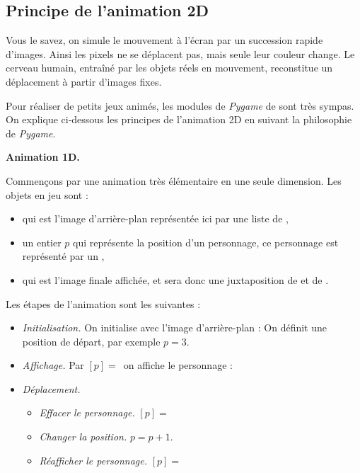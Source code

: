 \documentclass[11pt,class=report,crop=false]{standalone}
\begin{document}
\subsection{Principe de l'animation 2D}

Vous le savez, on simule le mouvement à l'écran par un succession rapide d'images.
Ainsi les pixels ne se déplacent pas, mais seule leur couleur change.
Le cerveau humain, entraîné par les objets réels en mouvement, reconstitue un déplacement à partir d'images fixes.


Pour réaliser de petits jeux animés, les modules de \emph{Pygame} de \Python{} sont très sympas.
On explique ci-dessous les principes de l'animation 2D en suivant la philosophie de \emph{Pygame}.


\textbf{Animation 1D.}

Commençons par une animation très élémentaire en une seule dimension.
Les objets en jeu sont :
\begin{itemize}
	\item {} qui est l'image d'arrière-plan représentée ici par une liste de ,
	\item un entier $p$ qui représente la position d'un personnage, ce personnage est représenté par un ,
	\item {} qui est l'image finale affichée, et sera donc une juxtaposition de  et de .
\end{itemize}

Les étapes de l'animation sont les suivantes :
\begin{itemize}
	\item \emph{Initialisation.}
	On initialise  avec l'image d'arrière-plan  :
	On définit une position de départ, par exemple $p=3$.
	
	\item \emph{Affichage.} Par $[p] = $\, on affiche le personnage :
	
	\item \emph{Déplacement.}
	\begin{itemize}
		\item \emph{Effacer le personnage.} $[p] = $\,
		\item \emph{Changer la position.} $p = p+1$.
		\item \emph{Réafficher le personnage.} $[p] = $\,		
	\end{itemize}

\end{itemize}
\end{document}
